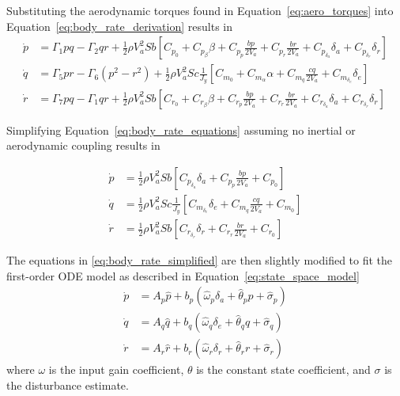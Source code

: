 Substituting the aerodynamic torques found in Equation~\ref{eq:aero_torques} into Equation~\ref{eq:body_rate_derivation} results in \cite{beard2012small}
\begin{equation}\label{eq:body_rate_equations}
\begin{split}
 \dot{p}&=\Gamma_1pq-\Gamma_2qr+\frac{1}{2}\rho V_a^2Sb\left[C_{p_0}+C_{p_\beta}\beta+C_{p_p}\frac{bp}{2V_a}+C_{p_r}\frac{br}{2V_a}+C_{p_{\delta_a}}\delta_a+C_{p_{\delta_r}}\delta_r\right]\\
 \dot{q}&=\Gamma_5pr-\Gamma_6(p^2-r^2)+\frac{1}{2}\rho V_a^2Sc\frac{1}{J_y}\left[C_{m_0}+C_{m_\alpha}\alpha+C_{m_q}\frac{cq}{2V_a}+C_{m_{\delta_e}}\delta_e\right]\\
 \dot{r}&=\Gamma_7pq-\Gamma_1qr+\frac{1}{2}\rho V_a^2Sb\left[C_{r_0}+C_{r_\beta}\beta+C_{r_p}\frac{bp}{2V_a}+C_{r_r}\frac{br}{2V_a}+C_{r_{\delta_a}}\delta_a+C_{r_{\delta_r}}\delta_r\right]
\end{split} 
\end{equation}

Simplifying Equation~\ref{eq:body_rate_equations} assuming no inertial or aerodynamic coupling results in

\begin{equation}\label{eq:body_rate_simplified}
\begin{split}
 \dot{p}&=\frac{1}{2}\rho V_a^2Sb\left[C_{p_{\delta_a}}\delta_a+C_{p_p}\frac{bp}{2V_a}+C_{p_0}\right]\\
 \dot{q}&=\frac{1}{2}\rho V_a^2Sc\frac{1}{J_y}\left[C_{m_{\delta_e}}\delta_e+C_{m_q}\frac{cq}{2V_a}+C_{m_0}\right]\\
 \dot{r}&=\frac{1}{2}\rho V_a^2Sb\left[C_{r_{\delta_r}}\delta_r+C_{r_r}\frac{br}{2V_a}+C_{r_0}\right]
\end{split} 
\end{equation}

The equations in \ref{eq:body_rate_simplified} are then slightly modified to fit the first-order \ac{ODE} model as described in Equation~\ref{eq:state_space_model}
\begin{equation}\label{eq:simplified_ac_model}
\begin{split}
\dot{p}&=A_p\hat{p}+b_p\left(\hat{\omega}_p\delta_a+\hat{\theta}_pp+\hat{\sigma}_p\right)\\
\dot{q}&=A_q\hat{q}+b_q\left(\hat{\omega}_q\delta_e+\hat{\theta}_qq+\hat{\sigma}_q\right)\\
\dot{r}&=A_r\hat{r}+b_r\left(\hat{\omega}_r\delta_r+\hat{\theta}_rr+\hat{\sigma}_r\right)
\end{split}
\end{equation}
where $\omega$ is the input gain coefficient, $\theta$ is the constant state coefficient, and $\sigma$ is the disturbance estimate.


